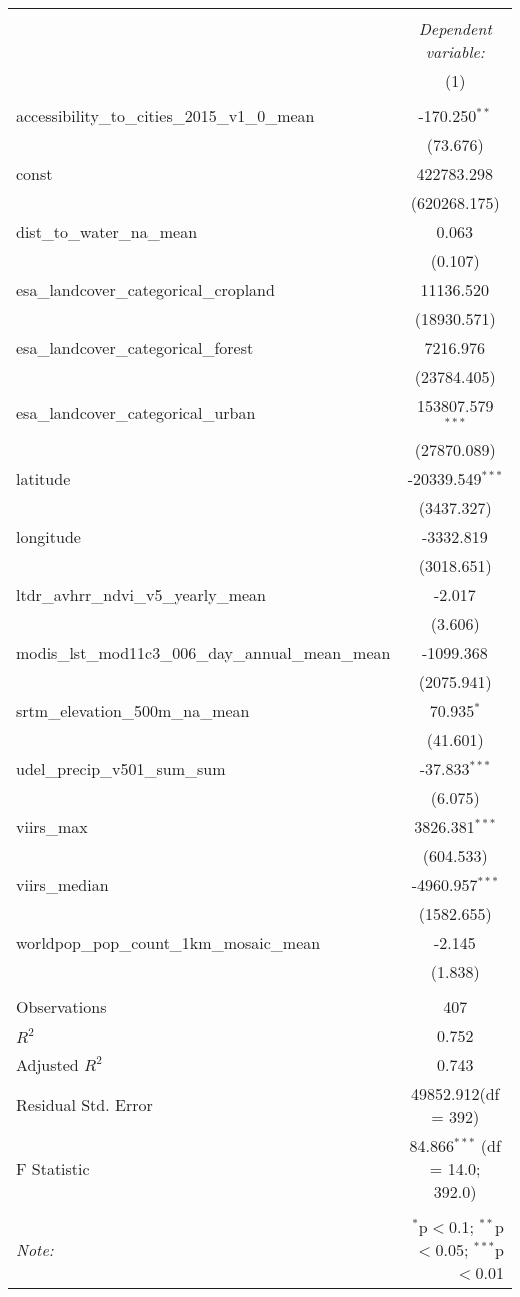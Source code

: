 \begin{table}[!htbp] \centering
\begin{tabular}{@{\extracolsep{5pt}}lc}
\\[-1.8ex]\hline
\hline \\[-1.8ex]
& \multicolumn{1}{c}{\textit{Dependent variable:}} \
\cr \cline{1-2}
\\[-1.8ex] & (1) \\
\hline \\[-1.8ex]
 accessibility_to_cities_2015_v1_0_mean & -170.250$^{**}$ \\
  & (73.676) \\
 const & 422783.298$^{}$ \\
  & (620268.175) \\
 dist_to_water_na_mean & 0.063$^{}$ \\
  & (0.107) \\
 esa_landcover_categorical_cropland & 11136.520$^{}$ \\
  & (18930.571) \\
 esa_landcover_categorical_forest & 7216.976$^{}$ \\
  & (23784.405) \\
 esa_landcover_categorical_urban & 153807.579$^{***}$ \\
  & (27870.089) \\
 latitude & -20339.549$^{***}$ \\
  & (3437.327) \\
 longitude & -3332.819$^{}$ \\
  & (3018.651) \\
 ltdr_avhrr_ndvi_v5_yearly_mean & -2.017$^{}$ \\
  & (3.606) \\
 modis_lst_mod11c3_006_day_annual_mean_mean & -1099.368$^{}$ \\
  & (2075.941) \\
 srtm_elevation_500m_na_mean & 70.935$^{*}$ \\
  & (41.601) \\
 udel_precip_v501_sum_sum & -37.833$^{***}$ \\
  & (6.075) \\
 viirs_max & 3826.381$^{***}$ \\
  & (604.533) \\
 viirs_median & -4960.957$^{***}$ \\
  & (1582.655) \\
 worldpop_pop_count_1km_mosaic_mean & -2.145$^{}$ \\
  & (1.838) \\
\hline \\[-1.8ex]
 Observations & 407 \\
 $R^2$ & 0.752 \\
 Adjusted $R^2$ & 0.743 \\
 Residual Std. Error & 49852.912(df = 392)  \\
 F Statistic & 84.866$^{***}$ (df = 14.0; 392.0) \\
\hline
\hline \\[-1.8ex]
\textit{Note:} & \multicolumn{1}{r}{$^{*}$p$<$0.1; $^{**}$p$<$0.05; $^{***}$p$<$0.01} \\
\end{tabular}
\end{table}